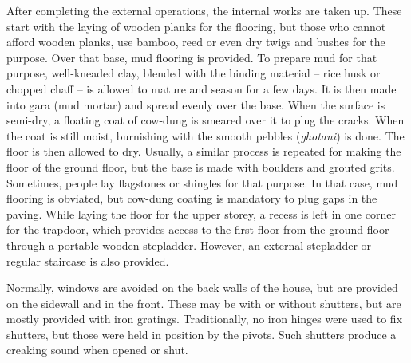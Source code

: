 After completing the external operations, the internal works are taken up. These start with the laying of wooden planks for the flooring, but those who cannot afford wooden planks, use bamboo, reed or even dry twigs and bushes for the purpose. Over that base, mud flooring is provided. To prepare mud for that purpose, well-kneaded clay, blended with the binding material – rice husk or chopped chaff – is allowed to mature and season for a few days. It is then made into gara (mud mortar) and spread evenly over the base. When the surface is semi-dry, a floating coat of cow-dung is smeared over it to plug the cracks. When the coat is still moist, burnishing with the smooth pebbles (\textit{ghotani}) is done. The floor is then allowed to dry. Usually, a similar process is repeated for making the floor of the ground floor, but the base is made with boulders and grouted grits. Sometimes, people lay flagstones or shingles for that purpose. In that case, mud flooring is obviated, but cow-dung coating is mandatory to plug gaps in the paving. While laying the floor for the upper storey, a recess is left in one corner for the trapdoor, which provides access to the first floor from the ground floor through a portable wooden stepladder. However, an external stepladder or regular staircase is also provided.

Normally, windows are avoided on the back walls of the house, but are provided on the sidewall and in the front. These may be with or without shutters, but are mostly provided with iron gratings. Traditionally, no iron hinges were used to fix shutters, but those were held in position by the pivots. Such shutters produce a creaking sound when opened or shut.

